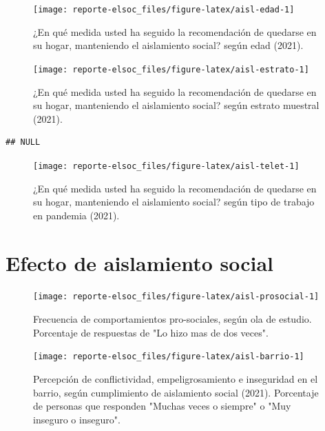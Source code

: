 \documentclass[
  12pt,
  openany]{book}
\begin{document}
\begin{figure}

{\centering \texttt{[image: reporte-elsoc\_files/figure-latex/aisl-edad-1]} 

}

\caption{¿En qué medida usted ha seguido la recomendación de quedarse en su hogar, manteniendo el aislamiento social? según edad (2021).}\label{fig:aisl-edad}
\end{figure}

\begin{figure}

{\centering \texttt{[image: reporte-elsoc\_files/figure-latex/aisl-estrato-1]} 

}

\caption{¿En qué medida usted ha seguido la recomendación de quedarse en su hogar, manteniendo el aislamiento social? según estrato muestral (2021).}\label{fig:aisl-estrato}
\end{figure}

\begin{verbatim}
## NULL
\end{verbatim}

\begin{figure}

{\centering \texttt{[image: reporte-elsoc\_files/figure-latex/aisl-telet-1]} 

}

\caption{¿En qué medida usted ha seguido la recomendación de quedarse en su hogar, manteniendo el aislamiento social? según tipo de trabajo en pandemia (2021).}\label{fig:aisl-telet}
\end{figure}

\hypertarget{efecto-de-aislamiento-social}{%
\section{Efecto de aislamiento social}\label{efecto-de-aislamiento-social}}

\begin{figure}

{\centering \texttt{[image: reporte-elsoc\_files/figure-latex/aisl-prosocial-1]} 

}

\caption{Frecuencia de comportamientos pro-sociales, según ola de estudio. Porcentaje de respuestas de "Lo hizo mas de dos veces".}\label{fig:aisl-prosocial}
\end{figure}

\begin{figure}

{\centering \texttt{[image: reporte-elsoc\_files/figure-latex/aisl-barrio-1]} 

}

\caption{Percepción de conflictividad, empeligrosamiento e inseguridad en el barrio, según cumplimiento de aislamiento social (2021). Porcentaje de personas que responden "Muchas veces o siempre" o "Muy inseguro o inseguro".}\label{fig:aisl-barrio}
\end{figure}
\end{document}
